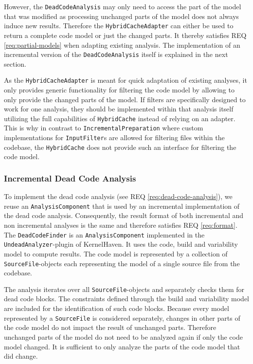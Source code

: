 \documentclass[a4paper]{article}
\begin{document}
However, the \texttt{Dead\-Code\-Analysis} may only need to access the part of the model that was modified as processing unchanged parts of the model does not always induce new results. Therefore the \texttt{Hybrid\-Cache\-Adapter} can either be used to return a complete code model or just the changed parts. It thereby satisfies REQ \ref{req:partial-models} when adapting existing analysis. The implementation of an incremental version of the \texttt{Dead\-Code\-Analysis} itself is explained in the next section.

As the \texttt{Hybrid\-Cache\-Adapter} is meant for quick adaptation of existing analyses, it only provides generic functionality for filtering the code model by allowing to only provide the changed parts of the model. If filters are specifically designed to work for one analysis, they should be implemented within that analysis itself utilizing the full capabilities of \texttt{Hybrid\-Cache} instead of relying on an adapter. This is why in contrast to \texttt{Incremental\-Preparation} where custom implementations for \texttt{InputFilter}s are allowed for filtering files within the codebase, the \texttt{Hybrid\-Cache} does not provide such an interface for filtering the code model.

\subsubsection{Incremental Dead Code Analysis} \label{incremental-dead-code-analysis}

To implement the dead code analysis (see REQ \ref{req:dead-code-analysis}), we reuse an \texttt{AnalysisComponent} that is used by an incremental implementation of the dead code analysis. Consequently, the result format of both incremental and non incremental analyses is the same and therefore satisfies REQ \ref{req:format}. The \texttt{Dead\-Code\-Finder} is an \texttt{Analysis\-Component} implemented in the \texttt{Undead\-Analyzer}-plugin of KernelHaven. It uses the code, build and variability model to compute results. The code model is represented by a collection of \texttt{Source\-File}-objects each representing the model of a single source file from the codebase.

The analysis iterates over all \texttt{Source\-File}-objects and separately checks them for dead code blocks. The constraints defined through the build and variability model are included for the identification of such code blocks. Because every model represented by a \texttt{Source\-File} is considered separately, changes in other parts of the code model do not impact the result of unchanged parts. Therefore unchanged parts of the model do not need to be analyzed again if only the code model changed. It is sufficient to only analyze the parts of the code model that did change.
\end{document}
